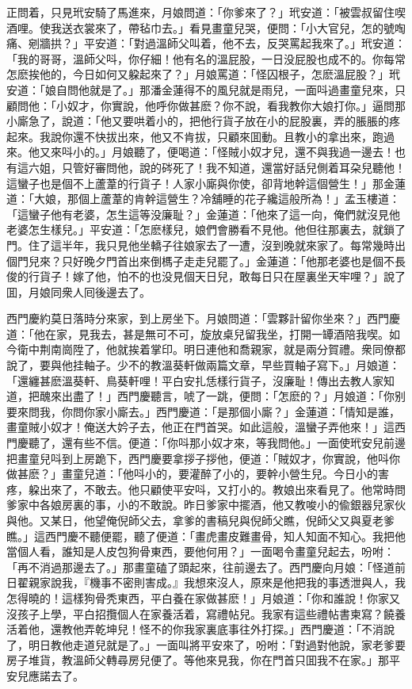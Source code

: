 正問着，只見玳安騎了馬進來，月娘問道：「你爹來了？」玳安道：「被雲叔留住喫酒哩。使我送衣裳來了，帶毡巾去。」看見畫童兒哭，便問：「小大官兒，怎的號啕痛、剜牆拱？」平安道：「對過溫師父叫着，他不去，反哭罵起我來了。」玳安道：「我的哥哥，溫師父呌，你仔細！他有名的溫屁股，一日没屁股也成不的。你每常怎麽挨他的，今日如何又躱起來了？」月娘罵道：「怪囚根子，怎麽溫屁股？」玳安道：「娘自問他就是了。」那潘金蓮得不的風兒就是雨兒，一面呌過畫童兒來，只顧問他：「小奴才，你實說，他呼你做甚麽？你不說，看我教你大娘打你。」逼問那小廝急了，說道：「他又要哄着小的，把他行貨子放在小的屁股裏，弄的脹脹的疼起來。我說你還不快拔出來，他又不肯拔，只顧來囬動。且教小的拿出來，跑過來。他又來呌小的。」月娘聽了，便喝道：「怪賊小奴才兒，還不與我過一邊去！也有這六姐，只管好審問他，說的硶死了！我不知道，還當好話兒側着耳朶兒聽他！這蠻子也是個不上蘆葦的行貨子！人家小廝與你使，卻背地幹這個營生！」那金蓮道：「大娘，那個上蘆葦的肯幹這營生？冷舖睡的花子纔這般所為！」孟玉樓道：「這蠻子他有老婆，怎生這等没廉耻？」金蓮道：「他來了這一向，俺們就沒見他老婆怎生樣兒。」平安道：「怎麽樣兒，娘們會勝看不見他。他但往那裏去，就鎖了門。住了這半年，我只見他坐轎子往娘家去了一遭，沒到晚就來家了。每常幾時出個門兒來？只好晚夕門首出來倒榪子走走兒罷了。」金蓮道：「他那老婆也是個不長俊的行貨子！嫁了他，怕不的也没見個天日兒，敢每日只在屋裏坐天牢哩？」說了囬，月娘同衆人囘後邊去了。

西門慶約莫日落時分來家，到上房坐下。月娘問道：「雲夥計留你坐來？」西門慶道：「他在家，見我去，甚是無可不可，旋放桌兒留我坐，打開一罈酒陪我喫。如今衛中荆南崗陞了，他就挨着掌印。明日連他和喬親家，就是兩分賀禮。衆同僚都說了，要與他挂軸子。少不的教溫葵軒做兩篇文章，早些買軸子寫下。」月娘道：「還纏甚麽溫葵軒、鳥葵軒哩！平白安扎恁樣行貨子，沒廉耻！傳出去教人家知道，把醜來出盡了！」西門慶聽言，唬了一跳，便問：「怎麽的？」月娘道：「你别要來問我，你問你家小廝去。」西門慶道：「是那個小廝？」金蓮道：「情知是誰，畫童賊小奴才！俺送大妗子去，他正在門首哭。如此這般，溫蠻子弄他來！」這西門慶聽了，還有些不信。便道：「你呌那小奴才來，等我問他。」一面使玳安兒前邊把畫童兒呌到上房跪下，西門慶要拿拶子拶他，便道：「賊奴才，你實說，他呌你做甚麽？」畫童兒道：「他呌小的，要灌醉了小的，要幹小營生兒。今日小的害疼，躱出來了，不敢去。他只顧使平安呌，又打小的。教娘出來看見了。他常時問爹家中各娘房裏的事，小的不敢說。昨日爹家中擺酒，他又教唆小的偸銀器兒家伙與他。又某日，他望俺倪師父去，拿爹的書稿兒與倪師父瞧，倪師父又與夏老爹瞧。」這西門慶不聽便罷，聽了便道：「畫虎畫皮難畫骨，知人知面不知心。我把他當個人看，誰知是人皮包狗骨東西，要他何用？」一面喝令畫童兒起去，吩咐：「再不消過那邊去了。」那畫童磕了頭起來，往前邊去了。西門慶向月娘：「怪道前日翟親家說我，『機事不密則害成。』我想來沒人，原來是他把我的事透泄與人，我怎得曉的！這樣狗骨秃東西，平白養在家做甚麽！」月娘道：「你和誰說！你家又沒孩子上學，平白招攬個人在家養活着，寫禮帖兒。我家有這些禮帖書柬寫？饒養活着他，還教他弄乾坤兒！怪不的你我家裏底事往外打探。」西門慶道：「不消說了，明日教他走道兒就是了。」一面叫將平安來了，吩咐：「對過對他說，家老爹要房子堆貨，教溫師父轉尋房兒便了。等他來見我，你在門首只囬我不在家。」那平安兒應諾去了。

